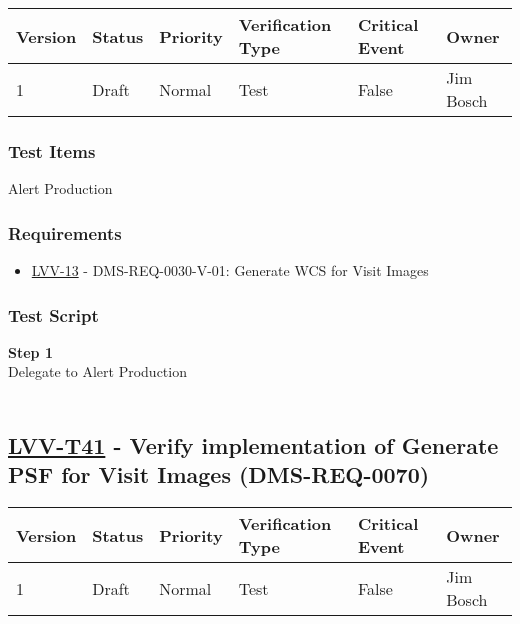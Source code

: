\begin{longtable}[]{@{}llllll@{}}
\toprule
Version & Status & Priority & Verification Type & Critical Event &
Owner\tabularnewline
\midrule
\endhead
1 & Draft & Normal & Test & False & Jim Bosch\tabularnewline
\bottomrule
\end{longtable}

\hypertarget{test-items-16}{%
\subsubsection{Test Items}\label{test-items-16}}

Alert Production~

\hypertarget{requirements-17}{%
\subsubsection{Requirements}\label{requirements-17}}

\begin{itemize}
\tightlist
\item
  \href{https://jira.lsstcorp.org/browse/LVV-13}{LVV-13} -
  DMS-REQ-0030-V-01: Generate WCS for Visit Images
\end{itemize}

\hypertarget{test-script-17}{%
\subsubsection{Test Script}\label{test-script-17}}

\textbf{Step 1}\\
Delegate to Alert Production\\
~\\

\hypertarget{lvv-t41---verify-implementation-of-generate-psf-for-visit-images-dms-req-0070}{%
\subsection{\texorpdfstring{\href{https://jira.lsstcorp.org/secure/Tests.jspa\#/testCase/LVV-T41}{LVV-T41}
- Verify implementation of Generate PSF for Visit Images
(DMS-REQ-0070)}{LVV-T41 - Verify implementation of Generate PSF for Visit Images (DMS-REQ-0070)}}\label{lvv-t41---verify-implementation-of-generate-psf-for-visit-images-dms-req-0070}}

\begin{longtable}[]{@{}llllll@{}}
\toprule
Version & Status & Priority & Verification Type & Critical Event &
Owner\tabularnewline
\midrule
\endhead
1 & Draft & Normal & Test & False & Jim Bosch\tabularnewline
\bottomrule
\end{longtable}

